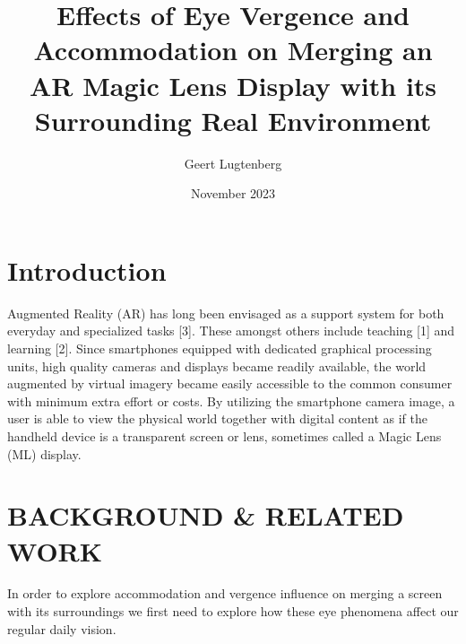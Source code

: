 \documentclass[preprint]{vgtc}               %
\title{Effects of Eye Vergence and Accommodation on Merging an AR Magic
Lens Display with its Surrounding Real Environment}
\author{Geert Lugtenberg}
\date{November 2023}
\begin{document}
\maketitle

\section{Introduction}
Augmented Reality (AR) has long been envisaged as a support system
for both everyday and specialized tasks [3]. These amongst
others include teaching [1] and learning [2]. Since smartphones
equipped with dedicated graphical processing units, high quality
cameras and displays became readily available, the world augmented
by virtual imagery became easily accessible to the common consumer
with minimum extra effort or costs. By utilizing the smartphone
camera image, a user is able to view the physical world together
with digital content as if the handheld device is a transparent
screen or lens, sometimes called a Magic Lens (ML) display.

\section{BACKGROUND & RELATED WORK}
In order to explore accommodation and vergence influence on merging
a screen with its surroundings we first need to explore how these
eye phenomena affect our regular daily vision.
\end{document}
